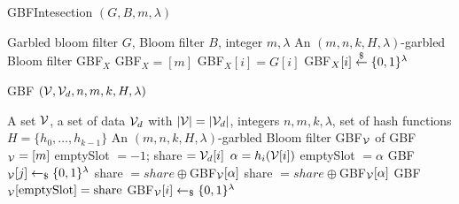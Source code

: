 \begin{algorithm}[htb]
\caption{GBFIntesection $(G, B, m, \lambda)$}
\label{alg:gbfintersection}
\begin{algorithmic}[1]
\REQUIRE Garbled bloom filter $G$, Bloom filter $B$, integer $m, \lambda$
\ENSURE An $(m, n, k, H, \lambda)$-garbled Bloom filter GBF$_X$
\STATE GBF$_X = [m]$ 
    \STATE GBF$_X[i] = G[i]$
  \ELSE
    \STATE GBF$_X[i] \stackrel{\$}{\gets} \{0,1\}^\lambda$
  \ENDIF
\ENDFOR
\end{algorithmic}
\end{algorithm}

\begin{algorithm}[htb]
\caption{GBF $(\mathcal{V}, \mathcal{V}_d , n, m, k, H, \lambda)$}
\label{alg:gbf}
\begin{algorithmic}[1]
\REQUIRE A set $\mathcal{V}$, a set of data $\mathcal{V}_d$ with $|\mathcal{V}|=|\mathcal{V}_d|$, integers $n, m, k, \lambda$, set of hash functions $H=\{h_0, \dots, h_{k-1}\}$
\ENSURE An $(m, n, k, H, \lambda)$-garbled Bloom filter GBF$_\mathcal{V}$ of \key
\STATE GBF$_\mathcal{V} = [m]$ 
  \STATE emptySlot $= -1$; share $=\mathcal{V}_d[i]$
    \STATE $\alpha=h_i(\mathcal{V}[i])$
        \STATE emptySlot $= \alpha$
        \ELSE
          \STATE GBF$_\mathcal{V}[j] \gets_{\$} \{0,1\}^\lambda$
          \STATE share $= share \oplus$GBF$_\mathcal{V}[\alpha]$
      \ENDIF
      \ELSE
        \STATE share $= share \oplus$GBF$_\mathcal{V}[\alpha]$
    \ENDIF
  \ENDFOR
  \STATE GBF$_\mathcal{V}[\text{emptySlot}]=\text{share}$
\ENDFOR
{}
    \STATE GBF$_\mathcal{V}[i] \gets_{\$} \{0,1\}^\lambda$
  \ENDIF
\ENDFOR
\end{algorithmic}
\end{algorithm}

